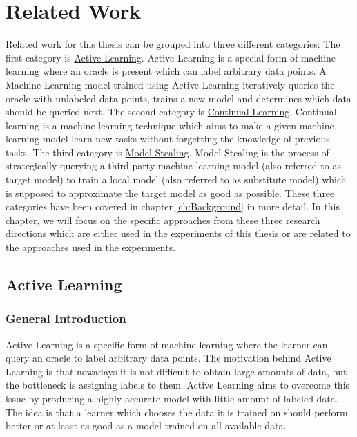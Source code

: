 
\chapter{Related Work}
\label{ch:Related_work}
Related work for this thesis can be grouped into three different categories: The first category is \hyperref[sec:Related_work:Active_Learning]
{Active Learning}. Active Learning is a special form of machine learning where an oracle is present which can label arbitrary data points.
A Machine Learning model trained using Active Learning iteratively queries the oracle with unlabeled data points, trains a new model and
determines which data should be queried next. The second category is \hyperref[sec:Related_work:Continual_Learning]{Continual Learning}.
Continual learning is a machine learning technique which aims to make a given machine learning model learn new tasks without forgetting
the knowledge of previous tasks. The third category is \hyperref[sec:Related_work:Model_Stealing]{Model Stealing}. Model Stealing is the process
of strategically querying a third-party machine learning model (also referred to as target model) to train a local model (also referred to as
substitute model) which is supposed to approximate the target model as good as possible. These three categories have been covered in chapter
\ref{ch:Background} in more detail. In this chapter, we will focus on the specific approaches from these three research directions which
are either used in the experiments of this thesis or are related to the approaches used in the experiments.

\section{Active Learning}
\label{sec:Related_work:Active_Learning}
\subsection{General Introduction}
Active Learning is a specific form of machine learning where the learner can query an oracle to label arbitrary data points.
The motivation behind Active Learning is that nowadays it is not difficult to obtain large amounts of data, but the bottleneck
is assigning labels to them. Active Learning aims to overcome this issue by producing a highly accurate model with little amount
 of labeled data. The idea is that a learner which chooses the data it is trained on should perform better or at least as good
 as a model trained on all available data.
